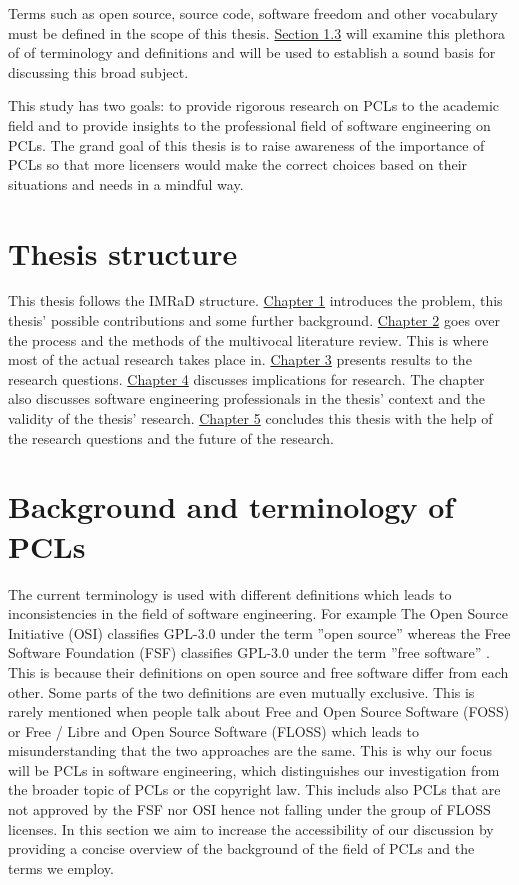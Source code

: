 Terms such as open source, source code, software freedom and other vocabulary must be defined in the scope of this thesis. \hyperref[sec:bg]{Section 1.3} will examine this plethora of of terminology and definitions and will be used to establish a sound basis for discussing this broad subject.

This study has two goals: to provide rigorous research on PCLs to the academic field and to provide insights to the professional field of software engineering on PCLs. The grand goal of this thesis is to raise awareness of the importance of PCLs so that more licensers would make the correct choices based on their situations and needs in a mindful way.

\section{Thesis structure}
This thesis follows the IMRaD structure. \hyperref[intro]{Chapter 1} introduces the problem, this thesis' possible contributions and some further background. \hyperref[methods]{Chapter 2} goes over the process and the methods of the multivocal literature review. This is where most of the actual research takes place in. \hyperref[results]{Chapter 3} presents results to the research questions. \hyperref[discussion]{Chapter 4} discusses implications for research. The chapter also discusses software engineering professionals in the thesis' context and the validity of the thesis' research. \hyperref[conclusions]{Chapter 5} concludes this thesis with the help of the research questions and the future of the research.

\section{Background and terminology of PCLs}
\label{sec:bg}
The current terminology is used with different definitions which leads to inconsistencies in the field of software engineering. For example The Open Source Initiative (OSI) classifies GPL-3.0 under the term ''open source'' whereas the Free Software Foundation (FSF) classifies GPL-3.0 under the term ''free software'' \citep{osi:gplv3}\citep{rms:opensource}. This is because their definitions on open source and free software differ from each other. Some parts of the two definitions are even mutually exclusive. This is rarely mentioned when people talk about Free and Open Source Software (FOSS) or Free / Libre and Open Source Software (FLOSS) which leads to misunderstanding that the two approaches are the same. This is why our focus will be PCLs in software engineering, which distinguishes our investigation from the broader topic of PCLs or the copyright law. This includs also PCLs that are not approved by the FSF nor OSI hence not falling under the group of FLOSS licenses. In this section we aim to increase the accessibility of our discussion by providing  a concise overview of the background of the field of PCLs and the terms we employ.

